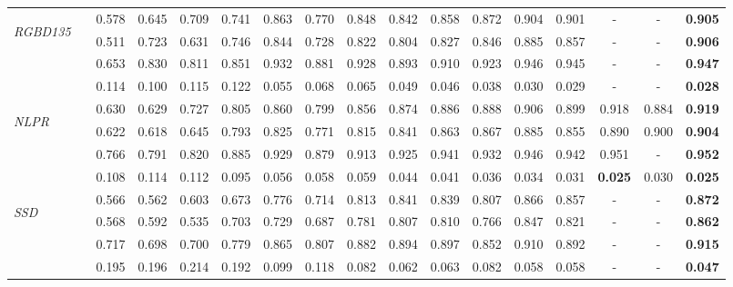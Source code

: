 \documentclass[runningheads]{llncs}
\begin{document}
\begin{table}[pt]
{\begin{tabular}{lr|ccccc|ccccccccc|c}
			\multirow{4}{*}{\begin{sideways}\textit{RGBD135}\end{sideways}}
			&  &0.578& 0.645 & 0.709 & 0.741 & 0.863 & 0.770 & 0.848 & 0.842  & 0.858 & 0.872 & 0.904 &0.901 &-&-& {\bf 0.905} \\
			&   &0.511& 0.723  & 0.631 & 0.746 & 0.844 & 0.728 & 0.822  & 0.804   & 0.827 & 0.846 & 0.885 &0.857 &-&-& {\bf 0.906} \\
			&  &0.653& 0.830 & 0.811 & 0.851 & 0.932 & 0.881 & 0.928  & 0.893   & 0.910 & 0.923 & 0.946 &0.945 &-&-& {\bf 0.947} \\
			&  &0.114& 0.100 & 0.115 & 0.122 & 0.055 & 0.068 & 0.065 & 0.049  & 0.046 & 0.038 & 0.030 &0.029 &-&-& {\bf 0.028} \\
			\midrule
			
			\multirow{4}{*}{\begin{sideways}\textit{NLPR}\end{sideways}}
			&  &0.630& 0.629 & 0.727 & 0.805 & 0.860 & 0.799 & 0.856  & 0.874  & 0.886 & 0.888 & 0.906 &0.899 &0.918&0.884& {\bf 0.919} \\
			&   &0.622& 0.618 & 0.645 & 0.793 & 0.825 & 0.771 & 0.815  & 0.841  & 0.863 & 0.867 & 0.885 &0.855 &0.890&0.900& {\bf 0.904} \\
			&  &0.766& 0.791 & 0.820 & 0.885 & 0.929 & 0.879 & 0.913  & 0.925  & 0.941 & 0.932 & 0.946 &0.942 &0.951&-& {\bf 0.952} \\
			&  &0.108& 0.114 & 0.112 & 0.095 & 0.056 & 0.058 & 0.059  & 0.044  & 0.041 & 0.036 & 0.034 &0.031 &{\bf 0.025}&0.030& {\bf 0.025} \\
			\midrule
			
			\multirow{4}{*}{\begin{sideways}\textit{SSD}\end{sideways}}
			&  &0.566& 0.562 & 0.603 & 0.673 & 0.776 & 0.714 & 0.813 & 0.841 & 0.839 & 0.807 & 0.866 &0.857 &-&-& {\bf 0.872} \\
			&  &0.568& 0.592 & 0.535 & 0.703 & 0.729 & 0.687 & 0.781 & 0.807 & 0.810 & 0.766 & 0.847 &0.821 &-&-& {\bf 0.862} \\
			&   &0.717& 0.698 & 0.700 & 0.779 & 0.865 & 0.807 & 0.882  & 0.894   & 0.897 & 0.852 & 0.910 &0.892 &-&-& {\bf 0.915} \\
			&  &0.195& 0.196 & 0.214 & 0.192 & 0.099 & 0.118 & 0.082  & 0.062   & 0.063 & 0.082 & 0.058 &0.058 &-&-& {\bf 0.047} \\
			\midrule
			

\end{tabular}}
\end{table}
\end{document}
